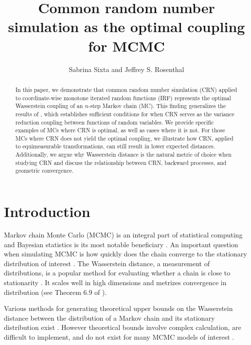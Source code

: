 \documentclass[12pt]{article}
\title{Common random number simulation as the optimal coupling for MCMC}
\author{Sabrina Sixta and Jeffrey S. Rosenthal}
\theoremstyle{plain}%
\theoremstyle{definition}
\begin{document}
	\maketitle
 \begin{abstract}
 	In this paper, we demonstrate that common random number simulation (CRN) applied to coordinate-wise monotone iterated random functions (IRF) represents the optimal Wasserstein coupling of an $n$-step Markov chain (MC). This finding generalizes the results of \cite{crn}, which establishes sufficient conditions for when CRN serves as the variance reduction coupling between functions of random variables. We provide specific examples of MCs where CRN is optimal, as well as cases where it is not. For those MCs where CRN does not yield the optimal coupling, we illustrate how CRN, applied to equimeasurable transformations, can still result in lower expected distances. Additionally, we argue why Wasserstein distance is the natural metric of choice when studying CRN and discuss the relationship between CRN, backward processes, and geometric convergence.
 \end{abstract}	
	\tableofcontents
\section{Introduction}

Markov chain Monte Carlo (MCMC) is an integral part of statistical computing and Bayesian statistics is its most notable beneficiary \cite{honestexp,handbook}. An important question when simulating MCMC is how quickly does the chain converge to the stationary distribution of interest \cite{honestexp}. The Wasserstein distance, a measurement of distributions, is a popular method for evaluating whether a chain is close to stationarity \cite{wasmeth, gibbswass}. It scales well in high dimensions \cite{wasmeth} and metrizes convergence in distribution (see Theorem 6.9 of \cite{villani}).

Various methods for generating theoretical upper bounds on the Wasserstein distance between the distribution of a Markov chain and its stationary distribution exist \cite{wasmeth, wassdnm}. However theoretical bounds involve complex calculation, are difficult to implement, and do not exist for many MCMC models of interest \cite{waslinearmixedmodels,wassdnm,sixta,localcont}. 
\end{document}
